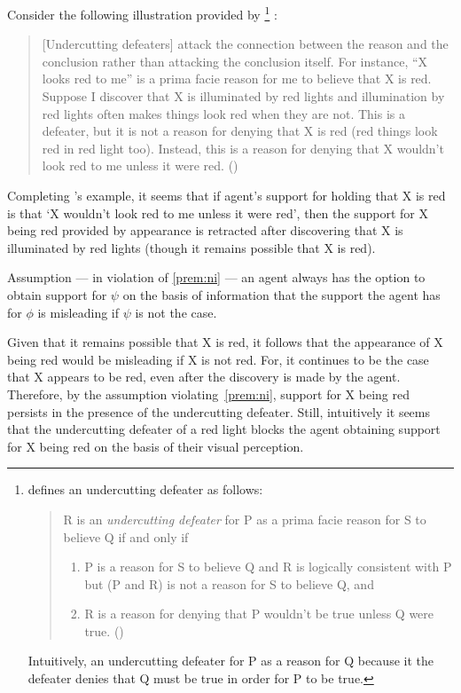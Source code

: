 \documentclass[10pt]{article}
\begin{document}
\begin{note}
  Consider the following illustration provided by \citeauthor{Pollock:1987un}\nolinebreak
  \footnote{
    \citeauthor{Pollock:1987un} defines an undercutting defeater as follows:
    \begin{quote}
      R is an \emph{undercutting defeater} for P as a prima facie reason for S to believe Q if and only if
      \begin{enumerate}[label=(UD\arabic*), ref=(UD\arabic*)]
      \item P is a reason for S to believe Q and R is logically consistent with P but (P and R) is not a reason for S to believe Q, and
      \item R is a reason for denying that P wouldn't be true unless Q were true.\nolinebreak
        \mbox{}\hfill\mbox{(\citeyear[485]{Pollock:1987un})}
      \end{enumerate}
    \end{quote}
    Intuitively, an undercutting defeater for P as a reason for Q because it the defeater denies that Q must be true in order for P to be true.
  }\nolinebreak
  :
  \begin{quote}
    [Undercutting defeaters] attack the connection between the reason and the conclusion rather than attacking the conclusion itself.
    For instance, ``X looks red to me'' is a prima facie reason for me to believe that X is red.
    Suppose I discover that X is illuminated by red lights and illumination by red lights often makes things look red when they are not.
    This is a defeater, but it is not a reason for denying that X is red (red things look red in red light too).
    Instead, this is a reason for denying that X wouldn't look red to me unless it were red.\nolinebreak
    \mbox{}\hfill\mbox{(\citeyear[485]{Pollock:1987un})}
  \end{quote}
  Completing \citeauthor{Pollock:1987un}'s example, it seems that if agent's support for holding that X is red is that `X wouldn't look red to me unless it were red', then the support for X being red provided by appearance is retracted after discovering that X is illuminated by red lights (though it remains possible that X is red).

  Assumption --- in violation of \ref{prem:ni} --- an agent always has the option to obtain support for \(\psi\) on the basis of information that the support the agent has for \(\phi\) is misleading if \(\psi\) is not the case.

  Given that it remains possible that X is red, it follows that the appearance of X being red would be misleading if X is not red.
  For, it continues to be the case that X appears to be red, even after the discovery is made by the agent.
  Therefore, by the assumption violating~\ref{prem:ni}, support for X being red persists in the presence of the undercutting defeater.
  Still, intuitively it seems that the undercutting defeater of a red light blocks the agent obtaining support for X being red on the basis of their visual perception.


\end{note}
\end{document}
